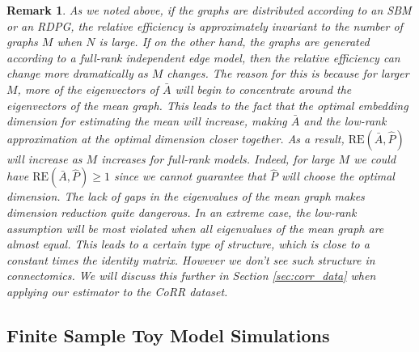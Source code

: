 \documentclass[10pt,letterpaper]{article}
\newtheorem{remark}[fact]{Remark}
\renewcommand{\hat}{\widehat}
\begin{document}
\begin{remark}\label{remark:low_rank}
As we noted above, if the graphs are distributed according to an SBM or an RDPG, the relative efficiency is approximately invariant to the number of graphs $M$ when $N$ is large.
If on the other hand, the graphs are generated according to a full-rank independent edge model, then the relative efficiency can change more dramatically as $M$ changes. 
The reason for this is because for larger $M$, more of the eigenvectors of $\bar{A}$ will begin to concentrate around the eigenvectors of the mean graph.
This leads to the fact that the optimal embedding dimension for estimating the mean will increase, making $\bar{A}$ and the low-rank approximation at the optimal dimension closer together. 
As a result, $\mathrm{RE}(\bar{A},\hat{P})$ will increase as $M$ increases for full-rank models.
Indeed, for large $M$ we could have $\mathrm{RE}(\bar{A},\hat{P})\geq 1$ since we cannot guarantee that $\hat{P}$ will choose the optimal dimension.
The lack of gaps in the eigenvalues of the mean graph makes dimension reduction quite dangerous.
In an extreme case, the low-rank assumption will be most violated when all eigenvalues of the mean graph are almost equal. This leads to a certain type of structure, which is close to a constant times the identity matrix. However we don't see such structure in connectomics.
We will discuss this further in Section \ref{sec:corr_data} when applying our estimator to the CoRR dataset.
\end{remark}

\subsection{Finite Sample Toy Model Simulations}\label{sec:sbm_sim}
\end{document}
